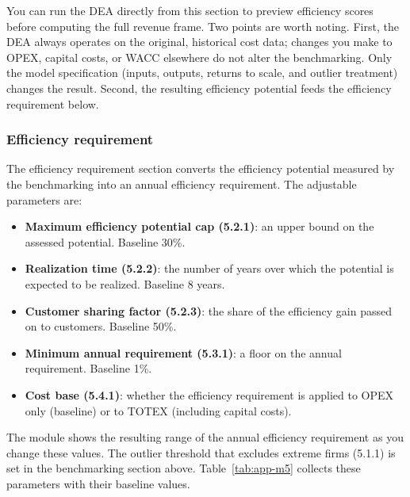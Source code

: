 \noindent You can run the DEA directly from this section to preview efficiency scores before computing the full revenue frame. Two points are worth noting. First, the DEA always operates on the original, historical cost data; changes you make to OPEX, capital costs, or WACC elsewhere do not alter the benchmarking. Only the model specification (inputs, outputs, returns to scale, and outlier treatment) changes the result. Second, the resulting efficiency potential feeds the efficiency requirement below.

\subsubsection{Efficiency requirement}
\label{sec:spec-m5-requirement}

The efficiency requirement section converts the efficiency potential measured by the benchmarking into an annual efficiency requirement. The adjustable parameters are:

\begin{itemize}
  \item \textbf{Maximum efficiency potential cap (5.2.1)}: an upper bound on the assessed potential. Baseline 30\%.
  \item \textbf{Realization time (5.2.2)}: the number of years over which the potential is expected to be realized. Baseline 8 years.
  \item \textbf{Customer sharing factor (5.2.3)}: the share of the efficiency gain passed on to customers. Baseline 50\%.
  \item \textbf{Minimum annual requirement (5.3.1)}: a floor on the annual requirement. Baseline 1\%.
  \item \textbf{Cost base (5.4.1)}: whether the efficiency requirement is applied to OPEX only (baseline) or to TOTEX (including capital costs).
\end{itemize}

\noindent The module shows the resulting range of the annual efficiency requirement as you change these values. The outlier threshold that excludes extreme firms (5.1.1) is set in the benchmarking section above. Table~\ref{tab:app-m5} collects these parameters with their baseline values.

